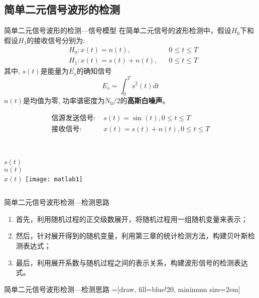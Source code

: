 \subsection{简单二元信号波形的检测}

\begin{frame}{简单二元信号波形的检测---信号模型}
在简单二元信号的波形检测中，假设$H_0$下和假设$H_1$的接收信号分别为:
\begin{align*}
&H_0: x(t)=n(t), &&0\le t\le T\\
&H_1: x(t)=s(t)+n(t), &&0\le t\le T
\end{align*}
其中, $s(t)$是能量为$E_s$的确知信号
\[E_s=\int_{0}^{T}s^2(t)dt\]
$n(t)$是均值为零, 功率谱密度为$N_0/2$的\textbf{高斯白噪声}。
\end{frame}

\begin{frame}%
\begin{align*}
\text{信源发送信号: } &s(t)=\sin(t),0 \le t\le T\\
\text{接收信号: } &x(t)=s(t)+n(t), 0\le t\le T
\end{align*}
\begin{columns}%
	~\\
	\vspace{0.2cm}
	$s(t)$\\
	\vspace{0.7cm}
	$n(t)$\\
	\vspace{0.7cm}
	$x(t)$
	\texttt{[image: matlab1]}
\end{columns}
\end{frame}

\begin{frame}{简单二元信号波形检测---检测思路}
\begin{enumerate}
	\setlength{\itemsep}{.5cm}
	\item 首先，利用随机过程的正交级数展开，将随机过程用一组随机变量来表示；
	\item 然后，针对展开得到的随机变量，利用第三章的统计检测方法，构建贝叶斯检测表达式；
	\item 最后，利用展开系数与随机过程之间的表示关系，构建波形信号的检测表达式。
\end{enumerate}
\end{frame}

\begin{frame}{简单二元信号波形检测---检测思路}
\centering
{}=[draw, fill=blue!20, minimum size=2em]
\end{frame}

